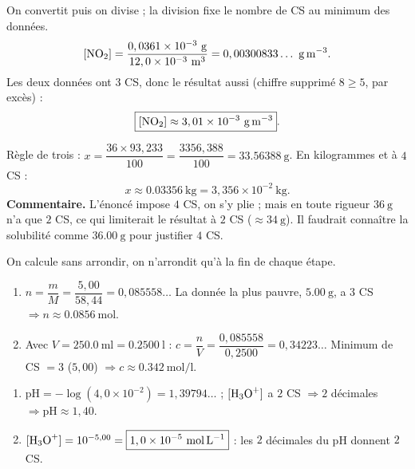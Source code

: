 \documentclass[11pt,a4paper]{article}
\begin{document}
\begin{corrige}
On convertit puis on divise ; la division fixe le nombre de CS au minimum des données.
\[ [\ce{NO2}]=\frac{0,0361\times10^{-3}\ \si{\gram}}{12,0\times10^{-3}\ \si{\cubic\metre}}
   =0,00300833\ldots\ \si{\gram\per\cubic\metre}. \]
Les deux données ont $3$ CS, donc le résultat aussi (chiffre supprimé $8\ge5$, par excès) :
\[ \boxed{[\ce{NO2}]\approx3,01\times10^{-3}\ \si{\gram\per\cubic\metre}}. \]
\end{corrige}

\begin{corrige}
Règle de trois : $x=\dfrac{36\times93,233}{100}=\dfrac{3356,388}{100}=\qty{33,56388}{\gram}$. En
kilogrammes et à $4$ CS :
\[ \boxed{x\approx\qty{0,03356}{\kilo\gram}=3,356\times10^{-2}\ \si{\kilo\gram}}. \]
\textbf{Commentaire.} L'énoncé impose $4$ CS, on s'y plie ; mais en toute rigueur $\qty{36}{\gram}$ n'a
que $2$ CS, ce qui limiterait le résultat à $2$ CS ($\approx\qty{34}{\gram}$). Il faudrait connaître la
solubilité comme $\qty{36,00}{\gram}$ pour justifier $4$ CS.
\end{corrige}

\begin{corrige}
On calcule sans arrondir, on n'arrondit qu'à la fin de chaque étape.
\begin{enumerate}[label=\alph*)]
  \item $n=\dfrac{m}{M}=\dfrac{5,00}{58,44}=0,085558\ldots$ La donnée la plus pauvre, $\qty{5,00}{\gram}$,
        a $3$ CS $\Rightarrow \boxed{n\approx\qty{0,0856}{\mole}}$.
  \item Avec $V=\qty{250,0}{\milli\litre}=\qty{0,2500}{\litre}$ :
        $c=\dfrac{n}{V}=\dfrac{0,085558}{0,2500}=0,34223\ldots$ Minimum de CS $=3$ ($5,00$) $\Rightarrow
        \boxed{c\approx\qty{0,342}{\mol\per\litre}}$.
\end{enumerate}
\end{corrige}

\begin{corrige}
\begin{enumerate}[label=\alph*)]
  \item $\mathrm{pH}=-\log(4,0\times10^{-2})=1,39794\ldots$ ; $[\ce{H3O+}]$ a $2$ CS $\Rightarrow 2$
        décimales $\Rightarrow \boxed{\mathrm{pH}\approx1,40}$.
  \item $[\ce{H3O+}]=10^{-5,00}=\boxed{1,0\times10^{-5}\ \si{\mol\per\litre}}$ : les $2$ décimales du pH
        donnent $2$ CS.
\end{enumerate}
\end{corrige}
\end{document}
